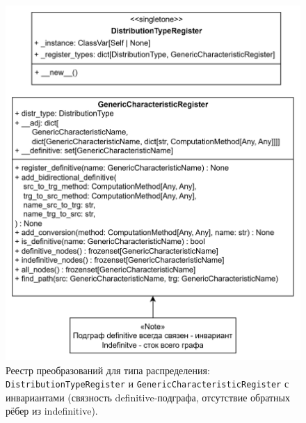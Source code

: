 \begin{figure}[htbp]
  \centering
  \includegraphics[width=\linewidth]{assets/images/Register.png}
  \caption{Реестр преобразований для типа распределения: \texttt{DistributionTypeRegister}
  и \texttt{GenericCharacteristicRegister} с инвариантами (связность definitive-подграфа,
  отсутствие обратных рёбер из indefinitive).}
  \label{fig:uml-register}
\end{figure}